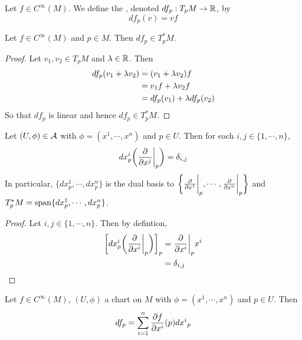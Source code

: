 \documentclass{book}
\begin{document}
	\begin{defn}
	Let $f \in C^{\infty}(M)$. We define the , denoted $df_p:T_pM \rightarrow \mathbb{R}$, by $$df_p(v) = vf$$
	\end{defn}
	
	\begin{ex}
	Let $f \in C^{\infty}(M)$ and $p \in M$. Then $df_p \in T^*_pM$.
	\end{ex}
	
	\begin{proof}
	Let $v_1, v_2 \in T_pM$ and $\lambda \in \mathbb{R}$. Then 
	\begin{align*}
	df_p(v_1 + \lambda v_2) 
	&= (v_1 + \lambda v_2) f \\
	&= v_1 f + \lambda v_2 f \\
	&= df_p(v_1) + \lambda df_p(v_2)
	\end{align*}
	So that $df_p$ is linear and hence $df_p \in T^*_pM$.
	\end{proof}
	
	\begin{ex}
		Let $(U, \phi) \in \mathcal{A}$ with $\phi = (x^1, \cdots, x^n)$ and $p \in U$. Then for each $i,j \in \{1, \cdots, n\}$, $$dx^i_p \bigg(\frac{\partial }{\partial x^j} \bigg|_p \bigg) = \delta_{i,j}$$ 
		In particular, $\{dx^1_p, \cdots, dx^n_p \}$ is the dual basis to $\bigg \{ \frac{\partial}{\partial x^1} \bigg|_p, \cdots, \frac{\partial}{\partial x^n} \bigg|_p \bigg \}$ and $T_p^*M = \operatorname{span}\{dx^1_p, \cdots, dx^n_p\}$.
	\end{ex}

	\begin{proof}
		Let $i,j \in \{1, \cdots, n\}$. Then  by defintion,
		\begin{align*}
			\bigg[ dx^i_p \bigg (\frac{\partial}{\partial x^i} \bigg|_p \bigg ) \bigg]_p 
			&= \frac{\partial}{\partial x^i} \bigg|_p x^i \\
			&= \delta_{i,j} \\
		\end{align*}
	\end{proof}
	
	\begin{ex}
		Let $f \in C^{\infty}(M)$, $(U, \phi)$ a chart on $M$ with $\phi = (x^1, \cdots, x^n)$ and $p \in U$. Then $$df_p = \sum_{i=1}^n \frac{\partial f}{\partial x^i}(p) {dx^i}_p$$
	\end{ex}
\end{document}
